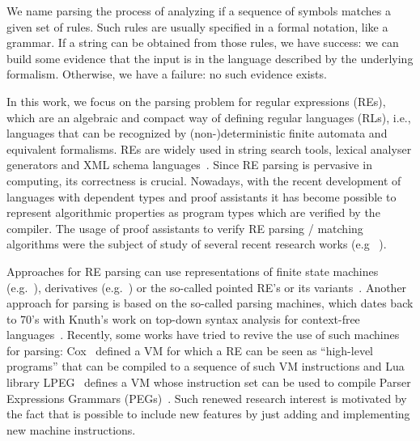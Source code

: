\documentclass[review]{elsarticle}
\theoremstyle{definition}
\begin{document}
We name parsing the process of analyzing if a sequence of symbols matches a given set of rules.
Such rules are usually specified in a formal notation, like a grammar. If a string can be obtained
from those rules, we have success: we can build some evidence that the input is in the language
described by the underlying formalism. Otherwise, we have a failure: no such evidence exists.

In this work, we focus on the parsing problem for regular expressions (REs), which are an algebraic
and compact way of defining regular languages (RLs), i.e., languages that can be recognized by
(non-)deterministic finite automata and equivalent formalisms. REs are widely used in string search
tools, lexical analyser generators and XML schema languages~\cite{Frisch2004}. Since RE parsing
is pervasive in computing, its correctness is crucial. Nowadays, with the recent
development of languages with dependent types and proof assistants it has become
possible to represent algorithmic properties as program types which are verified
by the compiler. The usage of proof assistants to verify RE parsing / matching algorithms
were the subject of study of several recent research works (e.g ~\cite{Firsov13,Ribeiro2017,Lopes2016,Asperti10}).

Approaches for RE parsing can use representations of finite state machines (e.g.~\cite{Firsov13}),
derivatives (e.g.~\cite{Ribeiro2017,Lopes2018,Lopes2016}) or the so-called pointed RE's or its
variants~\cite{Asperti10,Fischer2010}. Another approach for parsing is based on the so-called
parsing machines, which dates back to 70's with Knuth's work
on top-down syntax analysis for context-free languages~\cite{Knuth71}. Recently, some works
have tried to revive the use of such machines for parsing: Cox~\cite{Cox2009} defined a VM
for which a RE can be seen as ``high-level programs'' that can be compiled to a sequence of
such VM instructions and Lua library LPEG~\cite{Ierusalimschy2009} defines a VM whose instruction
set can be used to compile Parser Expressions Grammars (PEGs)~\cite{Ford04}. Such renewed research
interest is motivated by the fact that is possible to include new features by just adding and
implementing new machine instructions.
\end{document}
